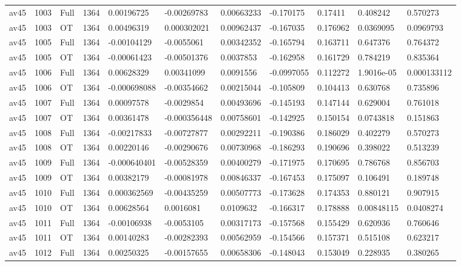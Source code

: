 \begin{landscape}
\begin{longtable}{lllllllllll}
av45 & 1003 & Full & 1364 & 0.00196725 & -0.00269783 & 0.00663233 & -0.170175 & 0.17411 & 0.408242 & 0.570273 \\
av45 & 1003 & OT & 1364 & 0.00496319 & 0.000302021 & 0.00962437 & -0.167035 & 0.176962 & 0.0369095 & 0.0969793 \\
av45 & 1005 & Full & 1364 & -0.00104129 & -0.0055061 & 0.00342352 & -0.165794 & 0.163711 & 0.647376 & 0.764372 \\
av45 & 1005 & OT & 1364 & -0.00061423 & -0.00501376 & 0.0037853 & -0.162958 & 0.161729 & 0.784219 & 0.835364 \\
av45 & 1006 & Full & 1364 & 0.00628329 & 0.00341099 & 0.0091556 & -0.0997055 & 0.112272 & 1.9016e-05 & 0.000133112 \\
av45 & 1006 & OT & 1364 & -0.000698088 & -0.00354662 & 0.00215044 & -0.105809 & 0.104413 & 0.630768 & 0.735896 \\
av45 & 1007 & Full & 1364 & 0.00097578 & -0.0029854 & 0.00493696 & -0.145193 & 0.147144 & 0.629004 & 0.761018 \\
av45 & 1007 & OT & 1364 & 0.00361478 & -0.000356448 & 0.00758601 & -0.142925 & 0.150154 & 0.0743818 & 0.151863 \\
av45 & 1008 & Full & 1364 & -0.00217833 & -0.00727877 & 0.00292211 & -0.190386 & 0.186029 & 0.402279 & 0.570273 \\
av45 & 1008 & OT & 1364 & 0.00220146 & -0.00290676 & 0.00730968 & -0.186293 & 0.190696 & 0.398022 & 0.513239 \\
av45 & 1009 & Full & 1364 & -0.000640401 & -0.00528359 & 0.00400279 & -0.171975 & 0.170695 & 0.786768 & 0.856703 \\
av45 & 1009 & OT & 1364 & 0.00382179 & -0.00081978 & 0.00846337 & -0.167453 & 0.175097 & 0.106491 & 0.189748 \\
av45 & 1010 & Full & 1364 & 0.000362569 & -0.00435259 & 0.00507773 & -0.173628 & 0.174353 & 0.880121 & 0.907915 \\
av45 & 1010 & OT & 1364 & 0.00628564 & 0.0016081 & 0.0109632 & -0.166317 & 0.178888 & 0.00848115 & 0.0408274 \\
av45 & 1011 & Full & 1364 & -0.00106938 & -0.0053105 & 0.00317173 & -0.157568 & 0.155429 & 0.620936 & 0.760646 \\
av45 & 1011 & OT & 1364 & 0.00140283 & -0.00282393 & 0.00562959 & -0.154566 & 0.157371 & 0.515108 & 0.623217 \\
av45 & 1012 & Full & 1364 & 0.00250325 & -0.00157655 & 0.00658306 & -0.148043 & 0.153049 & 0.228935 & 0.380265 \\

\end{longtable}
\end{landscape}
